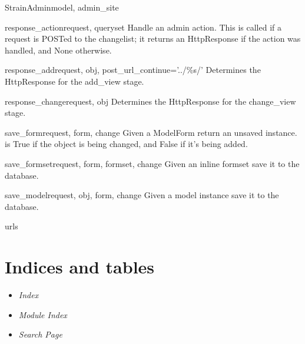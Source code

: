 \documentclass[letterpaper,10pt,english]{sphinxmanual}
\begin{document}
\begin{classdesc}{StrainAdmin}{model, admin\_site}
\hypertarget{animal.admin.StrainAdmin.response_action}{}\begin{methoddesc}{response\_action}{request, queryset}
Handle an admin action. This is called if a request is POSTed to the
changelist; it returns an HttpResponse if the action was handled, and
None otherwise.
\end{methoddesc}

\hypertarget{animal.admin.StrainAdmin.response_add}{}\begin{methoddesc}{response\_add}{request, obj, post\_url\_continue='../\%s/'}
Determines the HttpResponse for the add\_view stage.
\end{methoddesc}

\hypertarget{animal.admin.StrainAdmin.response_change}{}\begin{methoddesc}{response\_change}{request, obj}
Determines the HttpResponse for the change\_view stage.
\end{methoddesc}

\hypertarget{animal.admin.StrainAdmin.save_form}{}\begin{methoddesc}{save\_form}{request, form, change}
Given a ModelForm return an unsaved instance.  is True if
the object is being changed, and False if it's being added.
\end{methoddesc}

\hypertarget{animal.admin.StrainAdmin.save_formset}{}\begin{methoddesc}{save\_formset}{request, form, formset, change}
Given an inline formset save it to the database.
\end{methoddesc}

\hypertarget{animal.admin.StrainAdmin.save_model}{}\begin{methoddesc}{save\_model}{request, obj, form, change}
Given a model instance save it to the database.
\end{methoddesc}

\hypertarget{animal.admin.StrainAdmin.urls}{}\begin{memberdesc}{urls}\end{memberdesc}
\end{classdesc}


\chapter{Indices and tables}
\begin{itemize}
\item {} 
\emph{Index}

\item {} 
\emph{Module Index}

\item {} 
\emph{Search Page}

\end{itemize}


\renewcommand{\indexname}{Module Index}
\printmodindex
\renewcommand{\indexname}{Index}
\printindex
\end{document}
